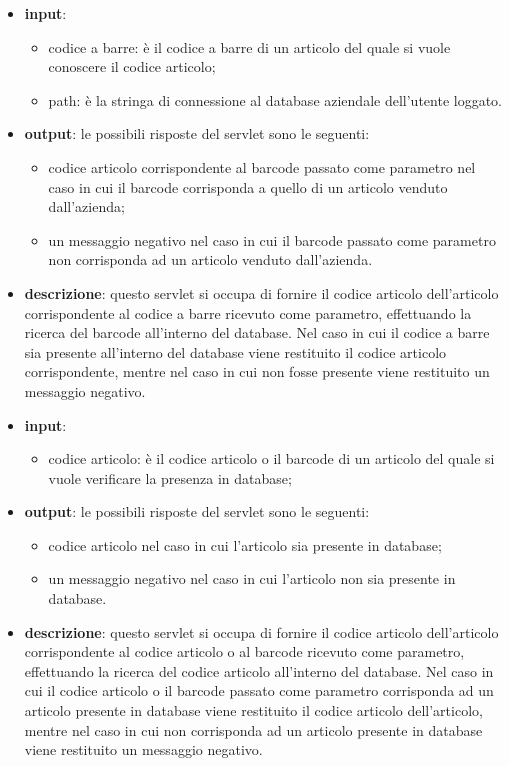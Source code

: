 
\begin{itemize}
	\item \textbf{input}:
		\begin{itemize}
			\item codice a barre: è il codice a barre di un articolo del quale si vuole conoscere il codice articolo;
			\item path: è la stringa di connessione al database aziendale dell'utente loggato.
		\end{itemize}
	\item \textbf{output}: le possibili risposte del servlet sono le seguenti:
		\begin{itemize}
			\item codice articolo corrispondente al barcode passato come parametro nel caso in cui il barcode corrisponda a quello di un articolo venduto dall'azienda;
			\item un messaggio negativo nel caso in cui il barcode passato come parametro non corrisponda ad un articolo venduto dall'azienda.
		\end{itemize}
	\item \textbf{descrizione}: questo servlet si occupa di fornire il codice articolo dell'articolo corrispondente al codice a barre ricevuto come parametro, effettuando la ricerca del barcode all'interno del database. Nel caso in cui il codice a barre sia presente all'interno del database viene restituito il codice articolo corrispondente, mentre nel caso in cui non fosse presente viene restituito un messaggio negativo.
\end{itemize}


\begin{itemize}
	\item \textbf{input}:
		\begin{itemize}
			\item codice articolo: è il codice articolo o il barcode di un articolo del quale si vuole verificare la presenza in database;
		\end{itemize}
	\item \textbf{output}: le possibili risposte del servlet sono le seguenti:
		\begin{itemize}
			\item codice articolo nel caso in cui l'articolo sia presente in database;
			\item un messaggio negativo nel caso in cui l'articolo non sia presente in database.
		\end{itemize}
	\item \textbf{descrizione}: questo servlet si occupa di fornire il codice articolo dell'articolo corrispondente al codice articolo o al barcode ricevuto come parametro, effettuando la ricerca del codice articolo all'interno del database. Nel caso in cui il codice articolo o il barcode passato come parametro corrisponda ad un articolo presente in database viene restituito il codice articolo dell'articolo, mentre nel caso in cui non corrisponda ad un articolo presente in database viene restituito un messaggio negativo.
\end{itemize}

